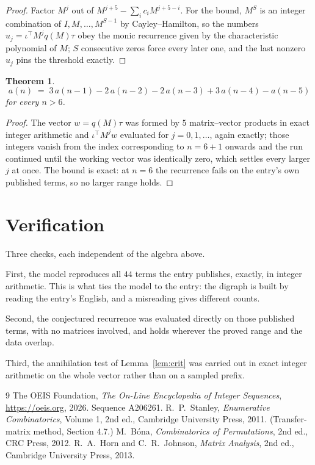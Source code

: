 \documentclass[11pt,a4paper]{article}
\theoremstyle{plain}
\newtheorem{theorem}{Theorem}
\theoremstyle{definition}
\begin{document}
\begin{proof}
Factor $M^{j}$ out of $M^{j+5}-\sum_ic_iM^{j+5-i}$. For the bound, $M^{S}$
is an integer combination of $I,M,\dots,M^{S-1}$ by Cayley--Hamilton, so the numbers
$u_j=\iota^{\!\top}M^{j}q(M)\tau$ obey the monic recurrence given by the characteristic
polynomial of $M$; $S$ consecutive zeros force every later one, and the last nonzero $u_j$
pins the threshold exactly.
\end{proof}

\begin{theorem}
\[
a(n)\;=\;3\,a(n-1) - 2\,a(n-2) - 2\,a(n-3) + 3\,a(n-4) - a(n-5)
\]
for every $n>6$.
\end{theorem}

\begin{proof}
The vector $w=q(M)\tau$ was formed by $5$ matrix--vector products in exact integer
arithmetic and $\iota^{\!\top}M^{j}w$ evaluated for $j=0,1,\dots$, again exactly; those
integers vanish from the index corresponding to $n=6+1$ onwards and the run continued
until the working vector was identically zero, which settles every larger $j$ at once. The bound is exact: at $n=6$ the recurrence fails on the entry's own published terms, so no larger range holds.
\end{proof}

\section{Verification}

Three checks, each independent of the algebra above.

First, the model reproduces all $44$ terms the entry publishes, exactly, in integer
arithmetic. This is what ties the model to the entry: the digraph is built by reading the
entry's English, and a misreading gives different counts.

Second, the conjectured recurrence was evaluated directly on those published terms, with no
matrices involved, and holds wherever the proved range and the data overlap.

Third, the annihilation test of Lemma~\ref{lem:crit} was carried out in exact integer
arithmetic on the whole vector rather than on a sampled prefix.

\begin{thebibliography}{9}
 The OEIS Foundation, \emph{The On-Line Encyclopedia of Integer
Sequences}, \url{https://oeis.org}, 2026. Sequence A206261.
 R.~P.~Stanley, \emph{Enumerative Combinatorics}, Volume 1, 2nd ed.,
Cambridge University Press, 2011. (Transfer-matrix method, Section 4.7.)
 M.~B\'ona, \emph{Combinatorics of Permutations}, 2nd ed., CRC
Press, 2012.
 R.~A.~Horn and C.~R.~Johnson, \emph{Matrix Analysis}, 2nd ed., Cambridge
University Press, 2013.
\end{thebibliography}
\end{document}
